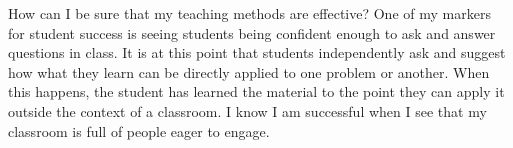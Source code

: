 \documentclass[a4paper]{article}
\begin{document}
How can I be sure that my teaching methods are effective?
One of my markers for student success is seeing students being confident enough to ask and answer questions in class.
It is at this point that students independently ask and suggest how what they learn can be directly applied to one problem or another.
When this happens, the student has learned the material to the point they can apply it outside the context of a classroom.
I know I am successful when I see that my classroom is full of people eager to engage.

\end{document}
